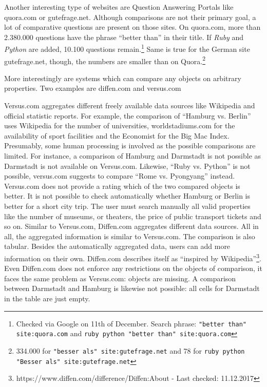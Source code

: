 Another interesting type of websites are Question Answering Portals like quora.com or gutefrage.net. Although comparisons are not their primary goal, a lot of comparative questions are present on those sites.
On quora.com, more than 2.380.000 questions have the phrase \enquote{better than} in their title. If \emph{Ruby} and \emph{Python} are added, 10.100 questions remain.\footnote{Checked via Google on 11th of December. Search phrase: \texttt{"better than" site:quora.com} and \texttt{ruby python "better than" site:quora.com}}
Same is true for the German site gutefrage.net, though, the numbers are smaller than on Quora.\footnote{334.000 for \texttt{"besser als" site:gutefrage.net} and 78 for \texttt{ruby python "Besser als" site:gutefrage.net}}\newline

More interestingly are systems which can compare any objects on arbitrary properties. Two examples are diffen.com and versus.com

Versus.com aggregates different freely available data sources like Wikipedia and official statistic reports. For example, the comparison of \enquote{Hamburg vs. Berlin} uses Wikipedia for the number of universities, worldstadiums.com for the availability of sport facilities and the Economist for the Big Mac Index. Presumably, some human processing is involved as the possible comparisons are limited. For instance, a comparison of Hamburg and Darmstadt is not possible as Darmstadt is not available on Versus.com. Likewise, \enquote{Ruby vs. Python} is not possible, versus.com suggests to compare \enquote{Rome vs. Pyongyang} instead. Versus.com does not provide a rating which of the two compared objects is better. It is not possible to check automatically whether Hamburg or Berlin is better for a short city trip. The user must search manually all valid properties like the number of museums, or theaters, the price of public transport tickets and so on.
Similar to Versus.com, Diffen.com aggregates different data sources. All in all, the aggregated information is similar to Versus.com. The comparison is also tabular. Besides the automatically aggregated data, users can add more information on their own. Diffen.com describes itself as \enquote{inspired by Wikipedia}\footnote{https://www.diffen.com/difference/Diffen:About - Last checked: 11.12.2017}. Even Diffen.com does not enforce any restrictions on the objects of comparison, it faces the same problem as Versus.com: objects are missing. A comparison between Darmstadt and Hamburg is likewise not possible: all cells for Darmstadt in the table are just empty.\newline

